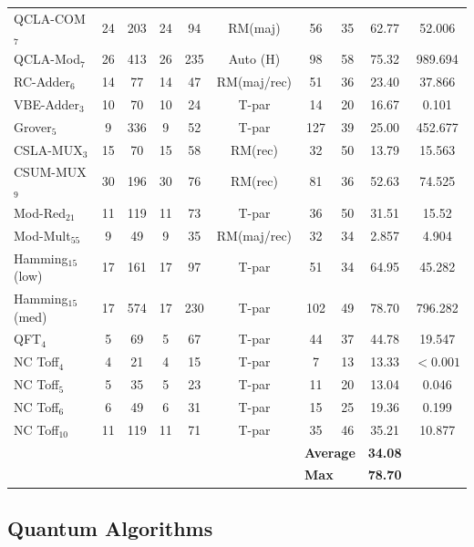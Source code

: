 \documentclass[notitlepage]{article}
\theoremstyle{definition}
\theoremstyle{problem}
\theoremstyle{lemma}
\begin{document}
\begin{table}[h!]
\begin{tabularx}{0.85\textwidth}{|X|cc|ccc|cccc|}
		QCLA-COM$_7$ & 24 & 203 & 24 & 94 & RM(maj)	& 56 & 35 & 62.77 & 52.006	\\
		QCLA-Mod$_7$ & 26 & 413 & 26 & 235 & Auto (H) & 98 & 58 & 75.32 & 989.694 \\
		RC-Adder$_6$ & 14 & 77 & 14 & 47 & RM(maj/rec) & 51 & 36 & 23.40 & 37.866 \\
		VBE-Adder$_3$ & 10 & 70 & 10 & 24 & T-par & 14 & 20 & 16.67 & 0.101 \\
		Grover$_5$ & 9 & 336 & 9 & 52 & T-par & 127 & 39 & 25.00 & 452.677 \\
		CSLA-MUX$_3$ & 15 & 70 & 15 & 58 & RM(rec) & 32 & 50 & 13.79 & 15.563 \\
		CSUM-MUX$_9$ & 30 & 196 & 30 & 76 & RM(rec) & 81 & 36 & 52.63 & 74.525 \\
		Mod-Red$_{21}$ & 11 & 119 & 11 & 73 & T-par & 36 & 50 & 31.51 & 15.52 \\
		Mod-Mult$_{55}$ & 9 & 49 & 9 & 35 & RM(maj/rec) & 32 & 34 & 2.857 & 4.904 \\
		Hamming$_{15}$ (low) & 17 & 161 & 17 & 97 & T-par & 51 & 34 & 64.95 & 45.282 \\
		Hamming$_{15}$ (med) & 17 & 574 & 17 & 230 & T-par & 102 & 49 & 78.70 & 796.282 \\
		QFT$_4$ & 5 & 69 & 5 & 67 & T-par & 44 & 37 & 44.78 & 19.547 \\
		NC Toff$_4$ & 4 & 21 & 4 & 15 & T-par & 7 & 13 & 13.33 & $<0.001$ \\
		NC Toff$_5$ & 5 & 35 & 5 & 23 & T-par & 11 & 20 & 13.04 & 0.046 \\
		NC Toff$_6$ & 6 & 49 & 6 & 31 & T-par & 15 & 25 & 19.36 & 0.199 \\
		NC Toff$_{10}$ & 11 & 119 & 11 & 71 & T-par & 35 & 46 & 35.21 & 10.877 \\
		\hline\multicolumn{6}{c|}{} & \multicolumn{2}{l}{\cellcolor{lightgray}\textbf{Average}} & \cellcolor{lightgray}\textbf{34.08} & \cellcolor{lightgray} \\
		\multicolumn{6}{c|}{} & \multicolumn{2}{l}{\cellcolor{lightgray}\textbf{Max}} & \cellcolor{lightgray}\textbf{78.70} & \cellcolor{lightgray} \\ \cline{7-10}				
		\end{tabularx}
		\label{tab_CliffT}		
	\end{table}
	
	\subsection{Quantum Algorithms}
\end{document}
